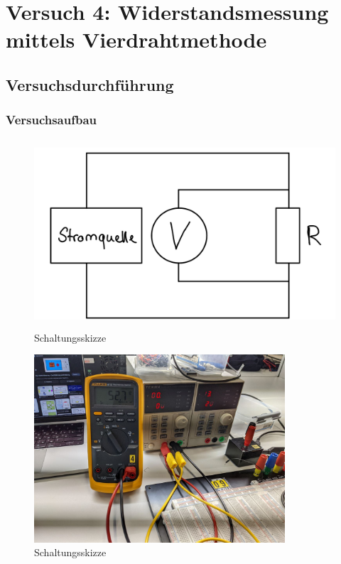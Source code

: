 \chapter{Versuch 4: Widerstandsmessung mittels Vierdrahtmethode}

\section{Versuchsdurchführung}

\subsection{Versuchsaufbau}

\begin{figure}[H]
	\centering
	\includegraphics[height=7cm]{images/Versuch4/Schaltskizze.jpeg}
	\caption{Schaltungsskizze}
	\label{fig: Schaltungsskizze}
\end{figure}

\begin{figure}[H]
	\centering
	\includegraphics[height=7cm]{images/Versuch4/Versuchsaufbau.jpeg}
	\caption{Schaltungsskizze}
	\label{fig: Schaltungsskizze}
\end{figure}



